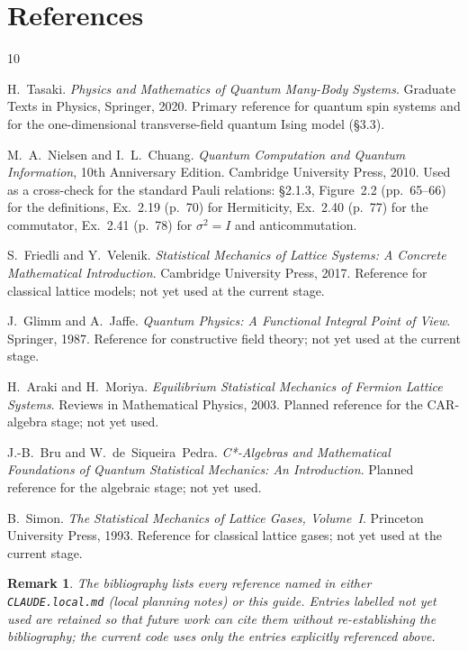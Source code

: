\documentclass[a4paper,11pt]{article}
\newtheorem{remark}[theorem]{Remark}
\begin{document}
\section{References}
\label{sec:refs}

\begin{thebibliography}{10}

H.~Tasaki.
\emph{Physics and Mathematics of Quantum Many-Body Systems}.
Graduate Texts in Physics, Springer, 2020. Primary reference for
quantum spin systems and for the one-dimensional transverse-field
quantum Ising model (§3.3).

M.~A.~Nielsen and I.~L.~Chuang.
\emph{Quantum Computation and Quantum Information}, 10th Anniversary
Edition. Cambridge University Press, 2010. Used as a cross-check for
the standard Pauli relations: §2.1.3, Figure~2.2 (pp.~65--66) for the
definitions, Ex.~2.19 (p.~70) for Hermiticity, Ex.~2.40 (p.~77) for
the commutator, Ex.~2.41 (p.~78) for $\sigma^2 = I$ and
anticommutation.

S.~Friedli and Y.~Velenik.
\emph{Statistical Mechanics of Lattice Systems: A Concrete
Mathematical Introduction}. Cambridge University Press, 2017.
Reference for classical lattice models; not yet used at the current
stage.

J.~Glimm and A.~Jaffe.
\emph{Quantum Physics: A Functional Integral Point of View}. Springer,
1987. Reference for constructive field theory; not yet used at the
current stage.

H.~Araki and H.~Moriya.
\emph{Equilibrium Statistical Mechanics of Fermion Lattice Systems}.
Reviews in Mathematical Physics, 2003. Planned reference for the
CAR-algebra stage; not yet used.

J.-B.~Bru and W.~de~Siqueira~Pedra.
\emph{C*-Algebras and Mathematical Foundations of Quantum Statistical
Mechanics: An Introduction}. Planned reference for the algebraic
stage; not yet used.

B.~Simon.
\emph{The Statistical Mechanics of Lattice Gases, Volume~I}. Princeton
University Press, 1993. Reference for classical lattice gases; not yet
used at the current stage.

\end{thebibliography}

\begin{remark}
The bibliography lists every reference named in either
\texttt{CLAUDE.local.md} (local planning notes) or this guide. Entries
labelled \emph{not yet used} are retained so that future work can cite
them without re-establishing the bibliography; the current code uses
only the entries explicitly referenced above.
\end{remark}
\end{document}
